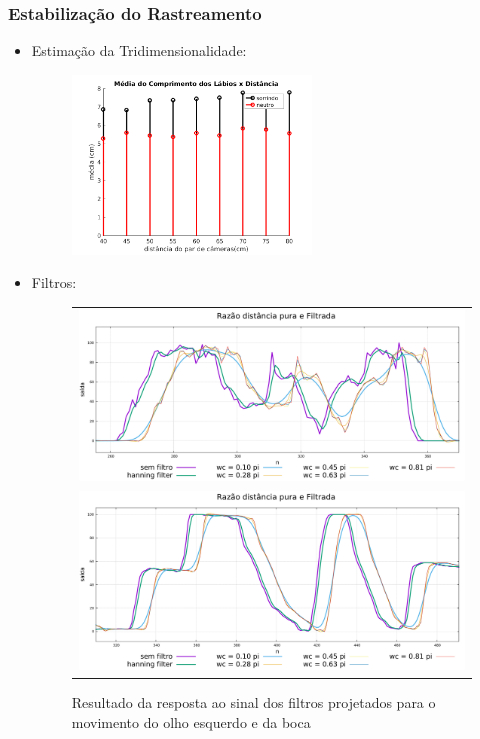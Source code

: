 \documentclass[brazil]{beamer}
\begin{document}
\begin{frame}
\frametitle{Estabilização do Rastreamento}
  \begin{itemize}
      \item Estimação da Tridimensionalidade:
      \begin{figure}
        \centering
        \includegraphics[width = 0.6\textwidth, keepaspectratio]{./img/media_3d.png}
      \end{figure}
               
  \end{itemize} 
\end{frame}

\begin{frame}
  \begin{itemize}
      \item Filtros:
      \begin{figure}
\centering
\begin{tabular}{c}
\includegraphics[width=0.6\linewidth]{./img/filter-result-left-eye.pdf} \\
\includegraphics[width=0.6\linewidth]{./img/filter-result-open-mouth.pdf} \\
\end{tabular}
\caption{Resultado da resposta ao sinal dos filtros projetados para o movimento do olho esquerdo e da boca}
\end{figure}
              
  \end{itemize} 
\end{frame}
\end{document}
